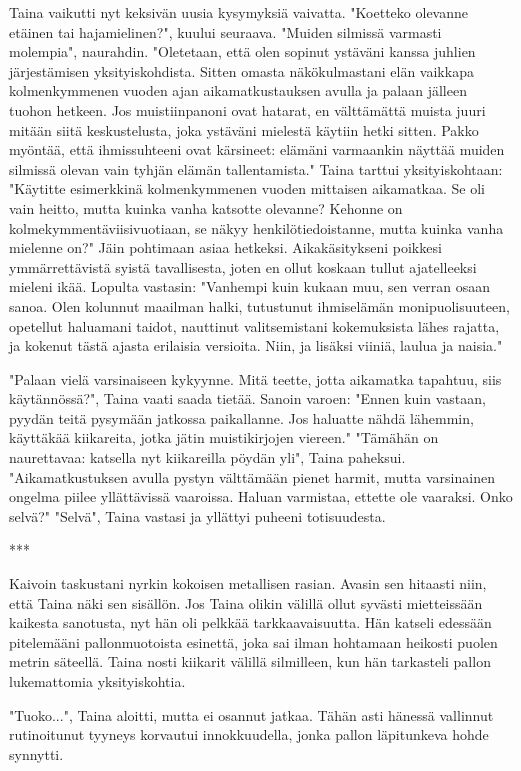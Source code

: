 ﻿\documentclass[a4paper, 12pt, finnish]{article}
\begin{document}
Taina vaikutti nyt keksivän uusia kysymyksiä vaivatta.
"Koetteko olevanne etäinen tai hajamielinen?", kuului seuraava.
"Muiden silmissä varmasti molempia", naurahdin. "Oletetaan, että
olen sopinut ystäväni kanssa juhlien järjestämisen yksityiskohdista.
Sitten omasta näkökulmastani elän vaikkapa kolmenkymmenen vuoden
ajan aikamatkustauksen avulla ja palaan jälleen tuohon hetkeen.
Jos muistiinpanoni ovat hatarat, en välttämättä muista juuri
mitään siitä keskustelusta, joka ystäväni mielestä
käytiin hetki sitten. Pakko myöntää, että ihmissuhteeni ovat
kärsineet: elämäni varmaankin näyttää muiden silmissä olevan
vain tyhjän elämän tallentamista."
Taina tarttui yksityiskohtaan: "Käytitte esimerkkinä kolmenkymmenen
vuoden mittaisen aikamatkaa. Se oli vain heitto, mutta kuinka
vanha katsotte olevanne? Kehonne on kolmekymmentäviisivuotiaan,
se näkyy henkilötiedoistanne, mutta kuinka vanha mielenne on?"
Jäin pohtimaan asiaa hetkeksi. Aikakäsitykseni poikkesi
ymmärrettävistä syistä tavallisesta, joten en ollut koskaan
tullut ajatelleeksi mieleni ikää. Lopulta vastasin:
"Vanhempi kuin kukaan
muu, sen verran osaan sanoa. Olen kolunnut maailman halki,
tutustunut ihmiselämän monipuolisuuteen, opetellut haluamani
taidot, nauttinut valitsemistani kokemuksista lähes rajatta,
ja kokenut tästä ajasta erilaisia versioita. Niin, ja lisäksi
viiniä, laulua ja naisia."

"Palaan vielä varsinaiseen kykyynne. Mitä teette,
jotta aikamatka tapahtuu, siis käytännössä?", Taina vaati saada
tietää. Sanoin varoen: "Ennen kuin vastaan, pyydän teitä
pysymään jatkossa paikallanne. Jos haluatte nähdä lähemmin,
käyttäkää kiikareita, jotka jätin muistikirjojen viereen."
"Tämähän on naurettavaa: katsella nyt kiikareilla pöydän yli",
Taina paheksui.
"Aikamatkustuksen avulla pystyn välttämään pienet harmit,
mutta varsinainen ongelma piilee yllättävissä vaaroissa. Haluan
varmistaa, ettette ole vaaraksi. Onko selvä?" 
"Selvä", Taina vastasi ja yllättyi puheeni totisuudesta.

***

Kaivoin taskustani nyrkin kokoisen metallisen rasian. Avasin sen
hitaasti niin, että Taina näki sen sisällön. Jos Taina olikin välillä
ollut syvästi mietteissään kaikesta sanotusta, nyt hän oli
pelkkää tarkkaavaisuutta. Hän katseli edessään pitelemääni
pallonmuotoista esinettä, joka sai ilman hohtamaan heikosti
puolen metrin säteellä. Taina nosti kiikarit välillä silmilleen,
kun hän tarkasteli pallon lukemattomia yksityiskohtia.

"Tuoko...", Taina aloitti, mutta ei osannut jatkaa.
Tähän asti hänessä vallinnut rutinoitunut tyyneys
korvautui innokkuudella, jonka pallon läpitunkeva hohde synnytti.
\end{document}
